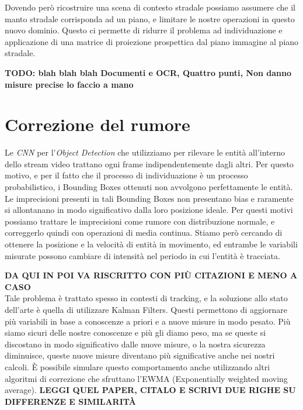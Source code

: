 Dovendo però ricostruire una scena di contesto stradale possiamo assumere che il manto stradale corrisponda ad un piano, e limitare le nostre operazioni in questo nuovo dominio.
Questo ci permette di ridurre il problema ad individuazione e applicazione di una matrice di proiezione prospettica dal piano immagine al piano stradale.

\textbf{TODO: blah blah blah Documenti e OCR, Quattro punti, Non danno misure precise lo faccio a mano}


\section{Correzione del rumore}
\label{sec:funzionalita-rumore}
Le \emph{CNN} per l'\emph{Object Detection} che utilizziamo per rilevare le entità all'interno dello stream video trattano ogni frame indipendentemente dagli altri.
Per questo motivo, e per il fatto che il processo di individuazione è un processo probabilistico, i Bounding Boxes ottenuti non avvolgono perfettamente le entità.
Le imprecisioni presenti in tali Bounding Boxes non presentano bias e raramente si allontanano in modo significativo dalla loro posizione ideale.
Per questi motivi possiamo trattare le imprecisioni come rumore con distribuzione normale, e correggerlo quindi con operazioni di media continua.
Stiamo però cercando di ottenere la posizione e la velocità di entità in movimento, ed entrambe le variabili misurate possono cambiare di intensità nel periodo in cui l'entità è tracciata.

\textbf{DA QUI IN POI VA RISCRITTO CON PIÙ CITAZIONI E MENO A CASO} \\
Tale problema è trattato spesso in contesti di tracking, e la soluzione allo stato dell'arte è quella di utilizzare Kalman Filters.
Questi permettono di aggiornare più variabili in base a conoscenze a priori e a nuove misure in modo pesato.
Più siamo sicuri delle nostre conoscenze e più gli diamo peso, ma se queste si discostano in modo significativo dalle nuove misure, o la nostra sicurezza diminuisce, queste nuove misure diventano più significative anche nei nostri calcoli.
È possibile simulare questo comportamento anche utilizzando altri algoritmi di correzione che sfruttano l'EWMA (Exponentially weighted moving average).
\textbf{LEGGI QUEL PAPER, CITALO E SCRIVI DUE RIGHE SU DIFFERENZE E SIMILARITÀ}
